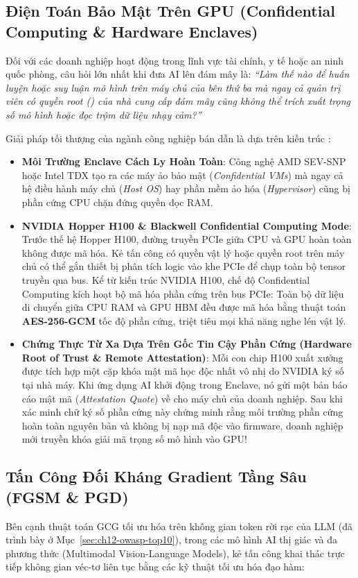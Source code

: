 \subsection{Điện Toán Bảo Mật Trên GPU (Confidential Computing \& Hardware Enclaves)}
\label{subsec:confidential-computing-gpu}
Đối với các doanh nghiệp hoạt động trong lĩnh vực tài chính, y tế hoặc an ninh quốc phòng, câu hỏi lớn nhất khi đưa AI lên đám mây là: \textit{``Làm thế nào để huấn luyện hoặc suy luận mô hình trên máy chủ của bên thứ ba mà ngay cả quản trị viên có quyền root () của nhà cung cấp đám mây cũng không thể trích xuất trọng số mô hình hoặc đọc trộm dữ liệu nhạy cảm?''}

Giải pháp tối thượng của ngành công nghiệp bán dẫn là  dựa trên kiến trúc :
\begin{itemize}
  \item \textbf{Môi Trường Enclave Cách Ly Hoàn Toàn}: Công nghệ AMD SEV-SNP hoặc Intel TDX tạo ra các máy ảo bảo mật (\textit{Confidential VMs}) mà ngay cả hệ điều hành máy chủ (\textit{Host OS}) hay phần mềm ảo hóa (\textit{Hypervisor}) cũng bị phần cứng CPU chặn đứng quyền đọc RAM.
  \item \textbf{NVIDIA Hopper H100 \& Blackwell Confidential Computing Mode}:
  Trước thế hệ Hopper H100, đường truyền PCIe giữa CPU và GPU hoàn toàn không được mã hóa. Kẻ tấn công có quyền vật lý hoặc quyền root trên máy chủ có thể gắn thiết bị phân tích logic vào khe PCIe để chụp toàn bộ tensor truyền qua bus.
  Kể từ kiến trúc NVIDIA H100, chế độ Confidential Computing kích hoạt bộ mã hóa phần cứng trên bus PCIe: Toàn bộ dữ liệu di chuyển giữa CPU RAM và GPU HBM đều được mã hóa bằng thuật toán \textbf{AES-256-GCM} tốc độ phần cứng, triệt tiêu mọi khả năng nghe lén vật lý.
  \item \textbf{Chứng Thực Từ Xa Dựa Trên Gốc Tin Cậy Phần Cứng (Hardware Root of Trust \& Remote Attestation)}:
  Mỗi con chip H100 xuất xưởng được tích hợp một cặp khóa mật mã học độc nhất vô nhị do NVIDIA ký số tại nhà máy. Khi ứng dụng AI khởi động trong Enclave, nó gửi một bản báo cáo mật mã (\textit{Attestation Quote}) về cho máy chủ của doanh nghiệp. Sau khi xác minh chữ ký số phần cứng này chứng minh rằng môi trường phần cứng hoàn toàn nguyên bản và không bị nạp mã độc vào firmware, doanh nghiệp mới truyền khóa giải mã trọng số mô hình vào GPU!
\end{itemize}

\subsection{Tấn Công Đối Kháng Gradient Tầng Sâu (FGSM \& PGD)}
\label{subsec:adversarial-gradient-attacks}
Bên cạnh thuật toán GCG tối ưu hóa trên không gian token rời rạc của LLM (đã trình bày ở Mục~\ref{sec:ch12-owasp-top10}), trong các mô hình AI thị giác và đa phương thức (Multimodal Vision-Language Models), kẻ tấn công khai thác trực tiếp không gian véc-tơ liên tục bằng các kỹ thuật tối ưu hóa đạo hàm:

